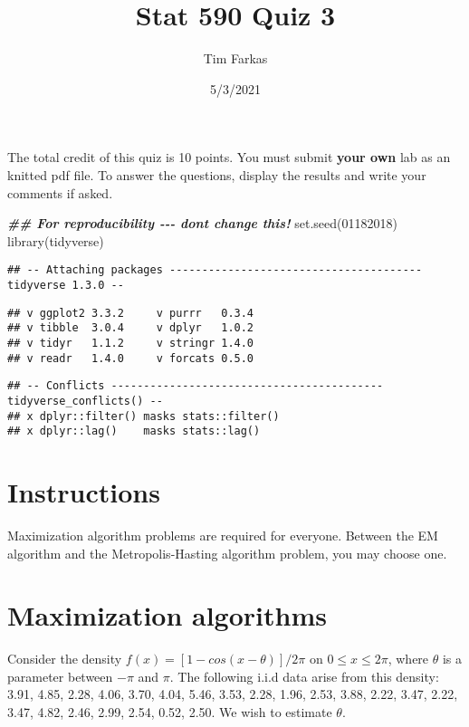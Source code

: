\documentclass[
]{article}
\title{Stat 590 Quiz 3}
\author{Tim Farkas}
\date{5/3/2021}
\newenvironment{Shaded}{\begin{snugshade}}{\end{snugshade}}
\newcommand{\DecValTok}[1]{\textcolor[rgb]{0.00,0.00,0.81}{#1}}
\newcommand{\DocumentationTok}[1]{\textcolor[rgb]{0.56,0.35,0.01}{\textbf{\textit{#1}}}}
\newcommand{\FunctionTok}[1]{\textcolor[rgb]{0.00,0.00,0.00}{#1}}
\newcommand{\NormalTok}[1]{#1}
\begin{document}
\maketitle

The total credit of this quiz is 10 points. You must submit \textbf{your
own} lab as an knitted pdf file. To answer the questions, display the
results and write your comments if asked.

\begin{Shaded}
\begin{Highlighting}[]
\DocumentationTok{\#\# For reproducibility {-}{-}{-} don\textquotesingle{}t change this!}
\FunctionTok{set.seed}\NormalTok{(}\DecValTok{01182018}\NormalTok{)}
\FunctionTok{library}\NormalTok{(tidyverse)}
\end{Highlighting}
\end{Shaded}

\begin{verbatim}
## -- Attaching packages --------------------------------------- tidyverse 1.3.0 --
\end{verbatim}

\begin{verbatim}
## v ggplot2 3.3.2     v purrr   0.3.4
## v tibble  3.0.4     v dplyr   1.0.2
## v tidyr   1.1.2     v stringr 1.4.0
## v readr   1.4.0     v forcats 0.5.0
\end{verbatim}

\begin{verbatim}
## -- Conflicts ------------------------------------------ tidyverse_conflicts() --
## x dplyr::filter() masks stats::filter()
## x dplyr::lag()    masks stats::lag()
\end{verbatim}

\hypertarget{instructions}{%
\section{Instructions}\label{instructions}}

Maximization algorithm problems are required for everyone. Between the
EM algorithm and the Metropolis-Hasting algorithm problem, you may
choose one.

\hypertarget{maximization-algorithms}{%
\section{Maximization algorithms}\label{maximization-algorithms}}

Consider the density \(f(x) = [1-cos(x-\theta)]/2\pi\) on
\(0\leq x \leq 2\pi\), where \(\theta\) is a parameter between \(-\pi\)
and \(\pi\). The following i.i.d data arise from this density: 3.91,
4.85, 2.28, 4.06, 3.70, 4.04, 5.46, 3.53, 2.28, 1.96, 2.53, 3.88, 2.22,
3.47, 2.22, 3.47, 4.82, 2.46, 2.99, 2.54, 0.52, 2.50. We wish to
estimate \(\theta\).
\end{document}
